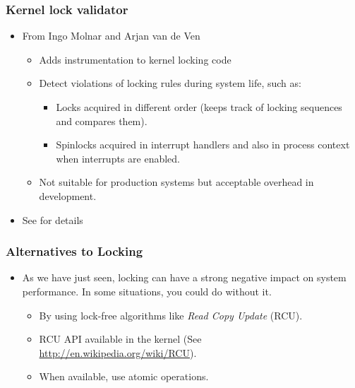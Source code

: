 \begin{frame}
  \frametitle{Kernel lock validator}
  \begin{itemize}
  \item From Ingo Molnar and Arjan van de Ven
    \begin{itemize}
    \item Adds instrumentation to kernel locking code
    \item Detect violations of locking rules during system life, such
      as:
      \begin{itemize}
      \item Locks acquired in different order (keeps track of locking
        sequences and compares them).
      \item Spinlocks acquired in interrupt handlers and also in
        process context when interrupts are enabled.
      \end{itemize}
    \item Not suitable for production systems but acceptable overhead
      in development.
    \end{itemize}
  \item See  for details
  \end{itemize}
\end{frame}

\begin{frame}
  \frametitle{Alternatives to Locking}
  \begin{itemize}
  \item As we have just seen, locking can have a strong negative
    impact on system performance. In some situations, you could do
    without it.
    \begin{itemize}
    \item By using lock-free algorithms like \emph{Read Copy Update}
      (RCU).
    \item RCU API available in the kernel (See
      \url{http://en.wikipedia.org/wiki/RCU}).
    \item When available, use atomic operations.
    \end{itemize}
  \end{itemize}
\end{frame}

